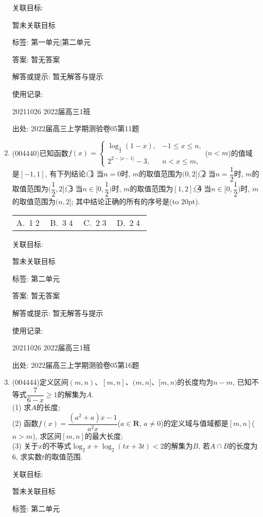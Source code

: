 \documentclass[10pt,a4paper]{article}
\newcommand{\bracket}[1]{(\hbox to #1pt{})}
\newcommand{\fourch}[4]{\par\begin{tabular}{p{.23\textwidth}p{.23\textwidth}p{.23\textwidth}p{.23\textwidth}}
A.~#1 &B.~#2& C.~#3& D.~#4
\end{tabular}}
\begin{document}
\begin{enumerate}[1.]
关联目标:

暂未关联目标



标签: 第一单元|第二单元

答案: 暂无答案

解答或提示: 暂无解答与提示

使用记录:

20211026	2022届高三1班	


出处: 2022届高三上学期测验卷05第11题
\item { (004440)}已知函数$f(x)=\begin{cases}\log_{\frac 12}(1-x), & -1\le x\le n,  \\ 2^{2-|x-1|}-3, & n<x\le m,  \end{cases}$($n<m$)的值域是$[-1,1]$, 有下列结论:
\textcircled{1} 当$n=0$时, $m$的取值范围为$(0,2]$; \textcircled{2}  当$n=\dfrac 12$时, $m$的取值范围为$(\dfrac 12,2]$; \textcircled{3}  当$n\in [0,\dfrac 12)$时, $m$的取值范围为$[1,2]$; \textcircled{4}  当$n\in [0,\dfrac 12)$时, $m$的取值范围为$(n,2]$;
其中结论正确的所有的序号是\bracket{20}.
\fourch{\textcircled{1}\textcircled{2}}{\textcircled{3}\textcircled{4}}{\textcircled{2}\textcircled{3}}{\textcircled{2}\textcircled{4}}


关联目标:

暂未关联目标



标签: 第二单元

答案: 暂无答案

解答或提示: 暂无解答与提示

使用记录:

20211026	2022届高三1班	


出处: 2022届高三上学期测验卷05第16题
\item { (004444)}定义区间$(m,n)$、$[m,n]$、$(m,n]$、$[m,n)$的长度均为$n-m$, 已知不等式$\dfrac 7{6-x}\ge 1$的解集为$A$.\\
(1) 求$A$的长度;\\
(2) 函数$f(x)=\dfrac{(a^2+a)x-1}{a^2x}$($a\in \mathbf{R}$, $a\ne 0$)的定义域与值域都是$[m,n]$($n>m$), 求区间$[m,n]$的最大长度;\\
(3) 关于$x$的不等式$\log_2x+\log_2(tx+3t)<2$的解集为$B$, 若$A\cap B$的长度为$6$, 求实数$t$的取值范围.


关联目标:

暂未关联目标



标签: 第二单元


\end{enumerate}
\end{document}

